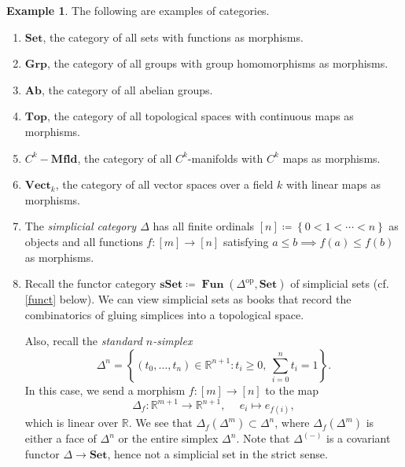 \documentclass[10pt,letterpaper,cm]{nupset}
\theoremstyle{definition}
\newtheorem{exmp}[definition]{Example}
\theoremstyle{theorem}
\theoremstyle{remark}
\newcommand{\R}{\mathbb R}
\newcommand{\1}{\mathbf{1}}
\newcommand{\0}{\vec 0}
\DeclareMathOperator{\op}{op}
\DeclareMathOperator{\Fun}{\mathbf{Fun}}
\begin{document}
\begin{exmp} The following are examples of categories.
\begin{enumerate}
\item $\mathbf{Set}$, the category of all sets with functions as morphisms.
\item $\mathbf{Grp}$, the category of all groups with group homomorphisms as morphisms.
\item $\mathbf{Ab}$, the category of all abelian groups.
\item $\mathbf{Top}$, the category of all topological spaces with continuous maps as morphisms.
\item $C^k{-}\mathbf{Mfld}$, the category of all $C^k$-manifolds with $C^k$ maps as morphisms.
\item $\mathbf{Vect}_k$, the category of all vector spaces over a field $k$ with linear maps as morphisms.
\item The \textit{simplicial category $\varDelta$} has all finite ordinals $\left[n\right] \coloneqq \left\{0 < 1 < \cdots < n\right\}$ as objects and all functions $f : \left[m\right] \to \left[n\right]$ satisfying $a \leq b \implies f(a) \leq f(b)$ as morphisms.
\item Recall the functor category $\mathbf{sSet} \coloneqq \Fun(\varDelta^{\op}, \mathbf{Set})$ of simplicial sets (cf. \cref{funct} below). We can view simplicial sets as books that record the combinatorics of gluing
simplices into a topological space. 

 Also, recall the \textit{standard $n$-simplex} $$\Delta^n = \left\{(t_0, \ldots, t_n) \in \R^{n+1} : t_i \geq 0, \ \sum_{i=0}^n t_i =1\right\}.$$ In this case, we send a morphism $f : [m] \to [n]$ to the map $$\Delta_f : \R^{m+1} \to \R^{n+1}, \ \quad e_i \mapsto e_{f(i)},$$ which is linear over $\R$. We see that $\Delta_f(\Delta^m) \subset \Delta^n$, where $\Delta_f(\Delta^m)$ is either a face of $\Delta^n$ or the entire simplex $\Delta^n$. Note that $\Delta^{(-)}$ is a covariant functor $\varDelta \to \mathbf{Set}$, hence not a simplicial set in the strict sense. 



\end{enumerate}
\end{exmp}
\end{document}
